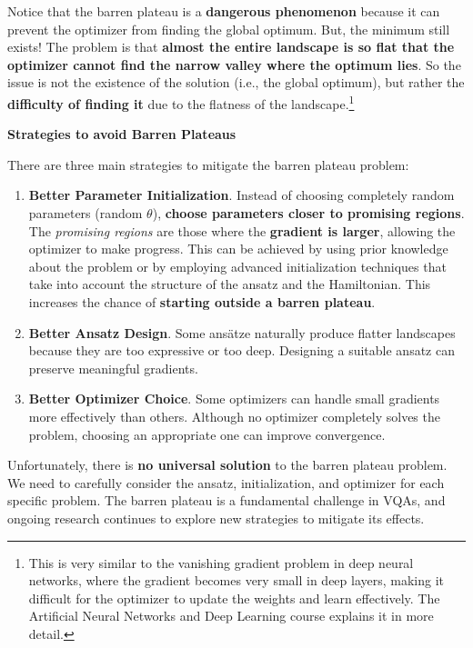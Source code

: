 \textcolor{Red2}{} Notice that the barren plateau is a \textbf{dangerous phenomenon} because it can prevent the optimizer from finding the global optimum. But, the minimum still exists! The problem is that \textbf{almost the entire landscape is so flat that the optimizer cannot find the narrow valley where the optimum lies}. So the issue is not the existence of the solution (i.e., the global optimum), but rather the \textbf{difficulty of finding it} due to the flatness of the landscape.\footnote{%
    This is very similar to the vanishing gradient problem in deep neural networks, where the gradient becomes very small in deep layers, making it difficult for the optimizer to update the weights and learn effectively. The Artificial Neural Networks and Deep Learning course explains it in more detail.
}

\highspace
\begin{flushleft}
    \textcolor{Green3}{ \textbf{Strategies to avoid Barren Plateaus}}
\end{flushleft}
There are three main strategies to mitigate the barren plateau problem:
\begin{enumerate}
    \item \textbf{Better Parameter Initialization}. Instead of choosing completely random parameters (random $\theta$), \textbf{choose parameters closer to promising regions}. The \emph{promising regions} are those where the \textbf{gradient is larger}, allowing the optimizer to make progress. This can be achieved by using prior knowledge about the problem or by employing advanced initialization techniques that take into account the structure of the ansatz and the Hamiltonian. This increases the chance of \textbf{starting outside a barren plateau}.
    

    \item \textbf{Better Ansatz Design}. Some ansätze naturally produce flatter landscapes because they are too expressive or too deep. Designing a suitable ansatz can preserve meaningful gradients.
    

    \item \textbf{Better Optimizer Choice}. Some optimizers can handle small gradients more effectively than others. Although no optimizer completely solves the problem, choosing an appropriate one can improve convergence.
\end{enumerate}
Unfortunately, there is \textbf{no universal solution} to the barren plateau problem. We need to carefully consider the ansatz, initialization, and optimizer for each specific problem. The barren plateau is a fundamental challenge in VQAs, and ongoing research continues to explore new strategies to mitigate its effects.

